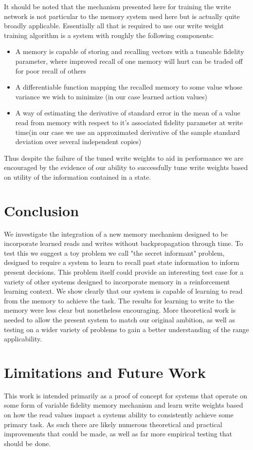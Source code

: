 \documentclass{article}
\begin{document}
It should be noted that the mechanism presented here for training the write network is not particular to the memory system used here but is actually quite broadly applicable. Essentially all that is required to use our write weight training algorithm is a system with roughly the following components:
\begin{itemize}
\item A memory is capable of storing and recalling vectors with a tuneable fidelity parameter, where improved recall of one memory will hurt can be traded off for poor recall of others
\item A differentiable function mapping the recalled memory to some value whose variance we wish to minimize (in our case learned action values)
\item A way of estimating the derivative of standard error in the mean of a value read from memory with respect to it's associated fidelity parameter at write time(in our case we use an approximated derivative of the sample standard deviation over several independent copies)
\end{itemize}
Thus despite the failure of the tuned write weights to aid in performance we are encouraged by the evidence of our ability to successfully tune write weights based on utility of the information contained in a state.

\section*{Conclusion}
We investigate the integration of a new memory mechanism designed to be incorporate learned reads and writes without backpropagation through time. To test this we suggest a toy problem we call "the secret informant" problem, designed to require a system to learn to recall past state information to inform present decisions. This problem itself could provide an interesting test case for a variety of other systems designed to incorporate memory in a reinforcement learning context. We show clearly that our system is capable of learning to read from the memory to achieve the task. The results for learning to write to the memory were less clear but nonetheless encouraging. More theoretical work is needed to allow the present system to match our original ambition, as well as testing on a wider variety of problems to gain a better understanding of the range applicability.

\section*{Limitations and Future Work}
This work is intended primarily as a proof of concept for systems that operate on some form of variable fidelity memory mechanism and learn write weights based on how the read values impact a systems ability to consistently achieve some primary task. As such there are likely numerous theoretical and practical improvements that could be made, as well as far more empirical testing that should be done. 
\end{document}
